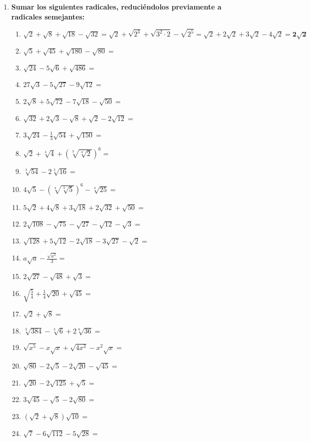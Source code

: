 \documentclass[a4paper,12pt]{article}
\begin{document}
\begin{enumerate}
    \item \textbf{Sumar los siguientes radicales, reduciéndolos previamente a radicales semejantes:}
    \begin{enumerate}[label=\alph*)]
        \item $\sqrt{2} + \sqrt{8} + \sqrt{18} - \sqrt{32} = \sqrt{2} + \sqrt{2^3} + \sqrt{3^2 \cdot 2} - \sqrt{2^5} = \sqrt{2} + 2\sqrt{2} + 3\sqrt{2} - 4\sqrt{2} = \mathbf{2\sqrt{2}}$
        \item $\sqrt{5} + \sqrt{45} + \sqrt{180} - \sqrt{80} =$
        \item $\sqrt{24} - 5\sqrt{6} + \sqrt{486} =$
        \item $27\sqrt{3} - 5\sqrt{27} - 9\sqrt{12} =$
        \item $2\sqrt{8} + 5\sqrt{72} - 7\sqrt{18} - \sqrt{50} =$
        \item $\sqrt{32} + 2\sqrt{3} - \sqrt{8} + \sqrt{2} - 2\sqrt{12} =$
        \item $3\sqrt{24} - \frac{1}{3}\sqrt{54} + \sqrt{150} =$
        \item $\sqrt{2} + \sqrt[4]{4} + (\sqrt[3]{\sqrt[4]{2}})^6 =$
        \item $\sqrt[3]{54} - 2\sqrt[3]{16} =$
        \item $4\sqrt{5} - (\sqrt[4]{\sqrt[3]{5}})^6 - \sqrt[4]{25} =$
        \item $5\sqrt{2} + 4\sqrt{8} + 3\sqrt{18} + 2\sqrt{32} + \sqrt{50} =$
        \item $2\sqrt{108} - \sqrt{75} - \sqrt{27} - \sqrt{12} - \sqrt{3} =$
        \item $\sqrt{128} + 5\sqrt{12} - 2\sqrt{18} - 3\sqrt{27} - \sqrt{2} =$
        \item $a\sqrt{a} - \frac{\sqrt{a^3}}{3} =$
        \item $2\sqrt{27} - \sqrt{48} + \sqrt{3} =$
        \item $\sqrt{\frac{5}{4}} + \frac{1}{4}\sqrt{20} + \sqrt{45} =$
        \item $\sqrt{2} + \sqrt{8} =$
        \item $\sqrt[3]{384} - \sqrt[3]{6} + 2\sqrt[6]{36} =$
        \item $\sqrt{x^5} - x\sqrt{x} + \sqrt{4x^3} - x^2 \sqrt{x} =$
        \item $\sqrt{80} - 2\sqrt{5} - 2\sqrt{20} - \sqrt{45} =$
        \item $\sqrt{20} - 2\sqrt{125} + \sqrt{5} =$
        \item $3\sqrt{45} - \sqrt{5} - 2\sqrt{80} =$
        \item $(\sqrt{2} + \sqrt{8})\sqrt{10} =$
        \item $\sqrt{7} - 6\sqrt{112} - 5\sqrt{28} =$
    \end{enumerate}
\end{enumerate}
\end{document}
